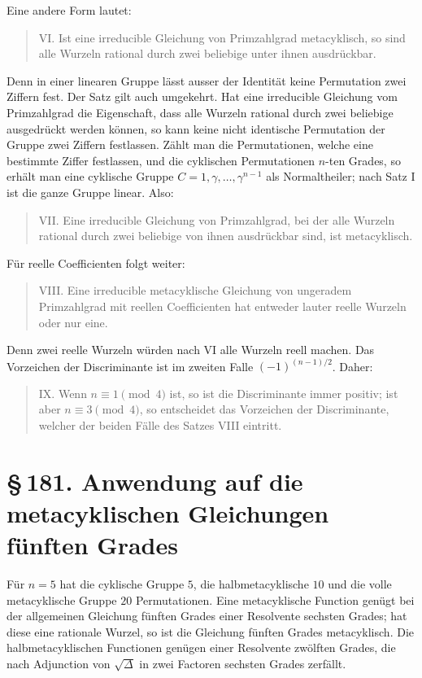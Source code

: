\documentclass[11pt]{article}
\providecommand{\sect}[2]{\section*{\S\,#1. #2}}
\begin{document}
Eine andere Form lautet:
\begin{quote}
VI. Ist eine irreducible Gleichung von Primzahlgrad metacyklisch, so sind alle Wurzeln rational durch zwei beliebige unter ihnen ausdrückbar.
\end{quote}
Denn in einer linearen Gruppe lässt ausser der Identität keine Permutation zwei Ziffern fest. Der Satz gilt auch umgekehrt. Hat eine irreducible Gleichung vom Primzahlgrad die Eigenschaft, dass alle Wurzeln rational durch zwei beliebige ausgedrückt werden können, so kann keine nicht identische Permutation der Gruppe zwei Ziffern festlassen. Zählt man die Permutationen, welche eine bestimmte Ziffer festlassen, und die cyklischen Permutationen $n$-ten Grades, so erhält man eine cyklische Gruppe $C=1,\gamma,\ldots,\gamma^{n-1}$ als Normaltheiler; nach Satz I ist die ganze Gruppe linear. Also:
\begin{quote}
VII. Eine irreducible Gleichung von Primzahlgrad, bei der alle Wurzeln rational durch zwei beliebige von ihnen ausdrückbar sind, ist metacyklisch.
\end{quote}

Für reelle Coefficienten folgt weiter:
\begin{quote}
VIII. Eine irreducible metacyklische Gleichung von ungeradem Primzahlgrad mit reellen Coefficienten hat entweder lauter reelle Wurzeln oder nur eine.
\end{quote}
Denn zwei reelle Wurzeln würden nach VI alle Wurzeln reell machen. Das Vorzeichen der Discriminante ist im zweiten Falle $(-1)^{(n-1)/2}$. Daher:
\begin{quote}
IX. Wenn $n\equiv1\pmod4$ ist, so ist die Discriminante immer positiv; ist aber $n\equiv3\pmod4$, so entscheidet das Vorzeichen der Discriminante, welcher der beiden Fälle des Satzes VIII eintritt.
\end{quote}

\sect{181}{Anwendung auf die metacyklischen Gleichungen fünften Grades}

Für $n=5$ hat die cyklische Gruppe $5$, die halbmetacyklische $10$ und die volle metacyklische Gruppe $20$ Permutationen. Eine metacyklische Function genügt bei der allgemeinen Gleichung fünften Grades einer Resolvente sechsten Grades; hat diese eine rationale Wurzel, so ist die Gleichung fünften Grades metacyklisch. Die halbmetacyklischen Functionen genügen einer Resolvente zwölften Grades, die nach Adjunction von $\sqrt\Delta$ in zwei Factoren sechsten Grades zerfällt.
\end{document}
